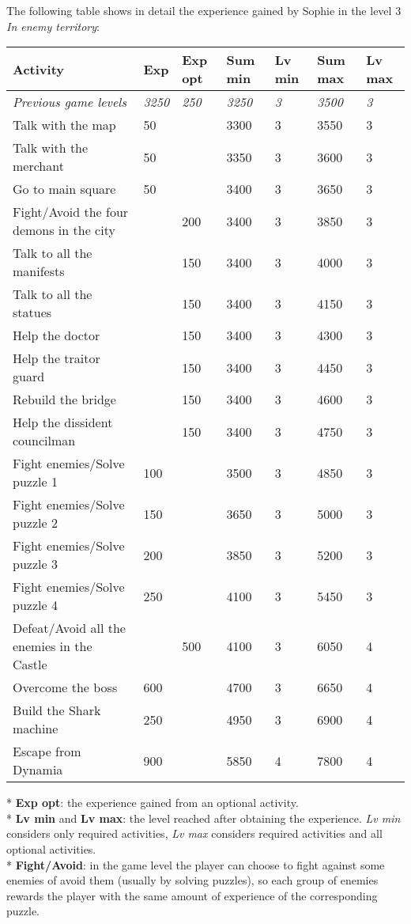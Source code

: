 The following table shows in detail the experience gained by Sophie in the level 3 \textit{In enemy territory}:
\begin{table}[H]
\centering
\begin{tabular}{|p{4cm}|l|l|l|l|l|l|}
\hline
\rowcolor[HTML]{C0C0C0} 
\textbf{Activity} & \textbf{Exp} & \textbf{Exp opt} & \textbf{Sum min} & \textbf{Lv min} & \textbf{Sum max} & \textbf{Lv max} \\ \hline
\textit{Previous game levels} & \textit{3250} & \textit{250} & \textit{3250} & \textit{3} & \textit{3500} & \textit{3} \\ \hline
Talk with the map & 50 &  & 3300 & 3 & 3550 & 3 \\ \hline
Talk with the merchant & 50 &  & 3350 & 3 & 3600 & 3 \\ \hline
Go to main square & 50 &  & 3400 & 3 & 3650 & 3 \\ \hline
Fight/Avoid the four demons in the city &  & 200 & 3400 & 3 & 3850 & 3 \\ \hline
Talk to all the manifests &  & 150 & 3400 & 3 & 4000 & 3 \\ \hline
Talk to all the statues &  & 150 & 3400 & 3 & 4150 & 3 \\ \hline
Help the doctor &  & 150 & 3400 & 3 & 4300 & 3 \\ \hline
Help the traitor guard &  & 150 & 3400 & 3 & 4450 & 3 \\ \hline
Rebuild the bridge &  & 150 & 3400 & 3 & 4600 & 3 \\ \hline
Help the dissident councilman &  & 150 & 3400 & 3 & 4750 & 3 \\ \hline
Fight enemies/Solve puzzle 1 & 100 &  & 3500 & 3 & 4850 & 3 \\ \hline
Fight enemies/Solve puzzle 2 & 150 &  & 3650 & 3 & 5000 & 3 \\ \hline
Fight enemies/Solve puzzle 3 & 200 &  & 3850 & 3 & 5200 & 3 \\ \hline
Fight enemies/Solve puzzle 4 & 250 &  & 4100 & 3 & 5450 & 3 \\ \hline
Defeat/Avoid all the enemies in the Castle &  & 500 & 4100 & 3 & 6050 & 4 \\ \hline
Overcome the boss & 600 &  & 4700 & 3 & 6650 & 4 \\ \hline
Build the Shark machine & 250 &  & 4950 & 3 & 6900 & 4 \\ \hline
Escape from Dynamia & 900 &  & 5850 & 4 & 7800 & 4 \\ \hline
\end{tabular}
\end{table}
* \textbf{Exp opt}: the experience gained from an optional activity. \\
* \textbf{Lv min} and \textbf{Lv max}: the level reached after obtaining the experience. \textit{Lv min} considers only required activities, \textit{Lv max} considers required activities and all optional activities. \\
* \textbf{Fight/Avoid}: in the game level the player can choose to fight against some enemies of avoid them (usually by solving puzzles), so each group of enemies rewards the player with the same amount of experience of the corresponding puzzle.
